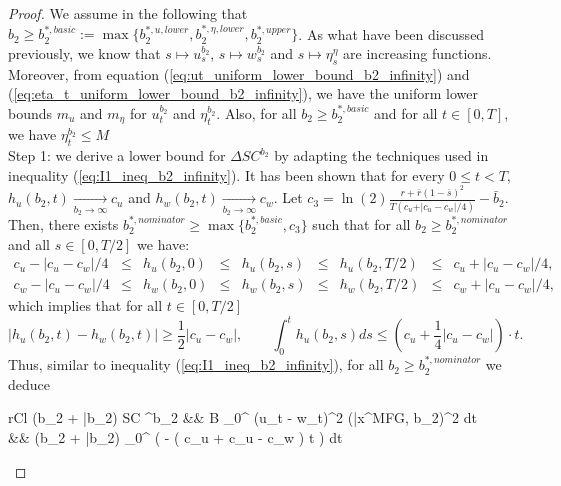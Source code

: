 \documentclass[11pt]{article}
\begin{document}
\begin{proof}
	We assume in the following that $b_2 \geq b_2^{*,basic} := \max \{b_2^{*,u,lower}, b_2^{*,\eta,lower}, b_2^{*,upper} \}$. As what have been discussed previously, we know that  $s \mapsto u_s^{b_2}$, $s \mapsto w_s^{b_2}$ and $s \mapsto \eta_s^{\eta}$ are increasing functions. Moreover, from equation (\ref{eq:ut_uniform_lower_bound_b2_infinity}) and (\ref{eq:eta_t_uniform_lower_bound_b2_infinity}), we have the uniform lower bounds $m_u$ and $m_\eta$ for $u_t^{b_2}$ and $\eta_t^{b_2}$. Also, for all $b_2 \geq b_2^{*,basic}$ and for all $t \in [0,T]$, we have $\eta_t^{b_2} \leq M$\\
	
	Step 1: we derive a lower bound for $\Delta SC^{b_2}$ by adapting the techniques used in inequality (\ref{eq:I1_ineq_b2_infinity}).  It has been shown that for every $0 \leq t <T$,  $h_u(b_2, t) \xrightarrow[b_2 \to \infty]{} c_u$ and $h_w(b_2, t) \xrightarrow[b_2 \to \infty]{} c_w$. Let $c_3 = \ln(2) \frac{r + \bar{r}(1-\bar{s})^2}{T (c_u + \vert c_u - c_w \vert / 4)} - \bar{b}_2$. Then, there exists $b_2^{*,nominator} \geq \max \{ b_2^{*,basic}, c_3 \}$ such that for all $b_2 \geq b_2^{*,nominator}$ and all $s \in [0, T/2]$ we have:
	\begin{equation*}
	\begin{array}{lclclclcl}
		c_u - \left\vert c_u - c_w  \right\vert /4 &\leq& h_u(b_2, 0) &\leq& h_u(b_2,s) &\leq& h_u(b_2, T/2) &\leq& c_u + \left\vert c_u - c_w \right\vert /4, \\
		c_w -  \left\vert c_u - c_w  \right\vert /4 &\leq& h_w(b_2, 0) &\leq& h_w(b_2,s) &\leq& h_w(b_2, T/2) &\leq& c_w + \left\vert c_u - c_w  \right\vert /4,
	\end{array}
	\end{equation*}
	which implies that for all $t \in [0,T/2]$
	$$ \left\vert h_u(b_2, t) - h_w(b_2,t)\right\vert \geq \frac{1}{2} \left\vert c_u - c_w \right\vert, \qquad \int_0^t h_u(b_2, s) ds \leq \left( c_u + \frac{1}{4} \left\vert c_u - c_w \right\vert \right) \cdot t.
	$$
	Thus, similar to inequality (\ref{eq:I1_ineq_b2_infinity}), for all $b_2 \geq b_2^{*,nominator}$ we deduce
	\begin{IEEEeqnarray}{rCl}
		(b_2 + \bar{b}_2) \Delta SC ^{b_2} &\geq &  B \int_0^{} (u_t - w_t)^2 (\bar{x}^{MFG, b_2})^2 dt \nonumber \\
		&\geq&  \cdot (b_2 + \bar{b}_2) \int_0^{} \exp \left( -  \cdot \left( c_u +  \left\vert c_u - c_w \right\vert \right) \cdot t \right) dt \nonumber \\

\end{IEEEeqnarray}
\end{proof}
\end{document}

